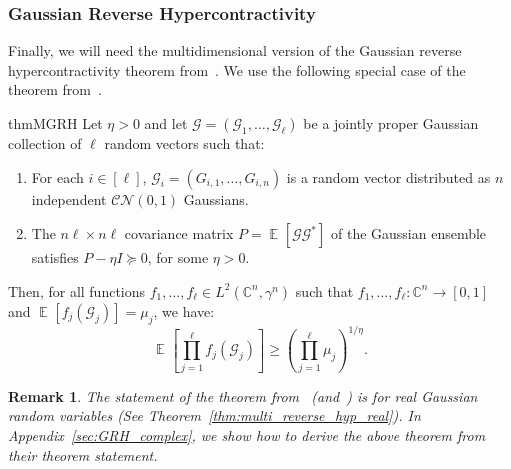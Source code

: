 \documentclass[11pt]{article}
\newtheorem{remark}[thm]{Remark}
\newcommand\card[1]{\left| {#1} \right|}
\newcommand\Expect[2]{{\mathop{\mathbb{E}}_{#1}\left[ {#2} \right]}}
\renewcommand\geq{\geqslant}
\begin{document}
\subsubsection{Gaussian Reverse Hypercontractivity}
Finally, we will need the multidimensional version of the Gaussian reverse hypercontractivity theorem from~\cite{ChenDafnisPaouris2015HolderGaussian}. We use the following special case of the theorem from~\cite{Mos}. 

\begin{restatable}{thm}{MGRH}{}\label{thm:multi_reverse_hyp}
	Let $\eta>0$ and let $\mathbf{\mathcal{G}} = (\mathcal{G}_1,\ldots,\mathcal{G}_{\ell})$ be a jointly proper Gaussian collection of $\ell$ random vectors such that:
	\begin{enumerate}
		\item For each $i \in [\ell]$, $\mathcal{G}_i = \left(G_{i,1}, \ldots, G_{i,n}\right)$ is a random vector distributed as $n$ independent $\mathcal{C}\mathcal{N}(0,1)$ Gaussians.
		\item  The $n\ell\times n\ell$ covariance matrix $P = \Expect{}{\mathcal{G}\mathcal{G}^*}$ of the Gaussian ensemble satisfies  $P-\eta I\succeq 0$, for some $\eta>0$. %
	\end{enumerate}
	Then, for all functions $f_1,\ldots,f_{\ell} \in L^2(\mathbb{C}^n,\gamma^n)$ such that $f_{1},\ldots,f_{\ell} : \mathbb{C}^n \to [0,1]$ and
	$\Expect{}{f_{j}(\mathcal{G}_{j})} = \mu_j$,
	we have:
	\[
	\Expect{}{\prod_{j=1}^\ell f_{j}(\mathcal{G}_{j})} \geq
	\left( \prod_{j=1}^\ell \mu_j \right)^{1/\eta}.
	\]
\end{restatable}

\begin{remark}
    The statement of the theorem from~\cite{ChenDafnisPaouris2015HolderGaussian} (and~\cite{Mos}) is for real Gaussian random variables (See Theorem~\ref{thm:multi_reverse_hyp_real}). In Appendix~\ref {sec:GRH_complex}, we show how to derive the above theorem from their theorem statement.
\end{remark}

\end{document}
